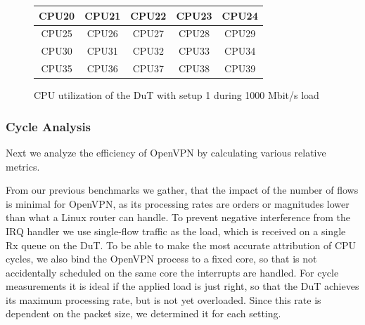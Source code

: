 \documentclass[IN,11pt,twoside,openright,master,english]{tumthesis}
\begin{document}
\begin{figure}[h]
{{\begin{tabular}[htp]{|c|c|c|c|c|}
\hline
\cellcolor{TUMBlue!64} CPU20 & \cellcolor{TUMBlue!93} CPU21 & \cellcolor{TUMBlue!93} CPU22 & \cellcolor{TUMBlue!93} CPU23 & \cellcolor{TUMBlue!93} CPU24 \\
\hline
\cellcolor{TUMBlue!93} CPU25 & \cellcolor{TUMBlue!93} CPU26 & \cellcolor{TUMBlue!93} CPU27 & \cellcolor{TUMBlue!93} CPU28 & \cellcolor{TUMBlue!93} CPU29 \\
\hline
\cellcolor{TUMBlue!93} CPU30 & \cellcolor{TUMBlue!93} CPU31 & \cellcolor{TUMBlue!93} CPU32 & \cellcolor{TUMBlue!93} CPU33 & \cellcolor{TUMBlue!93} CPU34 \\
\hline
\cellcolor{TUMBlue!64} CPU35 & \cellcolor{TUMBlue!93} CPU36 & \cellcolor{TUMBlue!64} CPU37 & \cellcolor{TUMBlue!64} CPU38 & \cellcolor{TUMBlue!93} CPU39 \\
\hline
		\end{tabular}
	}
}
\caption{CPU utilization of the DuT with setup 1 during 1000 Mbit/s load}
\label{fig:openvpn-setup1-60bytes-heatmap}
\end{figure}


\subsubsection{Cycle Analysis}
\label{sec:openvpn-cycle-analysis}

Next we analyze the efficiency of OpenVPN by calculating various relative metrics.

From our previous benchmarks we gather, that the impact of the number of flows is minimal for OpenVPN, as its processing rates are orders or magnitudes lower than what a Linux router can handle. To prevent negative interference from the IRQ handler we use single-flow traffic as the load, which is received on a single Rx queue on the DuT. 
To be able to make the most accurate attribution of CPU cycles, we also bind the OpenVPN process to a fixed core, so that is not accidentally scheduled on the same core the interrupts are handled.
For cycle measurements it is ideal if the applied load is just right, so that the DuT achieves its maximum processing rate, but is not yet overloaded. Since this rate is dependent on the packet size, we determined it for each setting.
\end{document}
